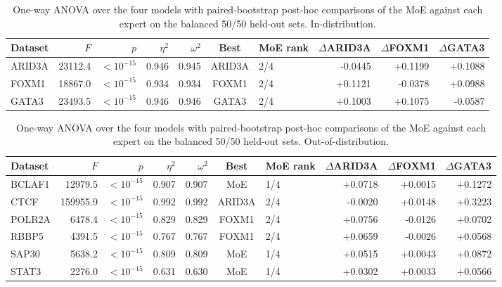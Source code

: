 \begin{table}[ht]
\centering
\caption{One-way ANOVA over the four models with paired-bootstrap post-hoc comparisons of the MoE against each expert on the balanced 50/50 held-out sets. In-distribution.}
\label{tab:rigorous_indist}
\begin{tabular}{lrrrrclrrr}
\hline
Dataset & $F$ & $p$ & $\eta^2$ & $\omega^2$ & Best & MoE rank & $\Delta$ARID3A & $\Delta$FOXM1 & $\Delta$GATA3 \\
\hline
ARID3A & 23112.4 & $<10^{-15}$ & 0.946 & 0.945 & ARID3A & 2/4 & -0.0445 & +0.1199 & +0.1088 \\
FOXM1 & 18867.0 & $<10^{-15}$ & 0.934 & 0.934 & FOXM1 & 2/4 & +0.1121 & -0.0378 & +0.0988 \\
GATA3 & 23493.5 & $<10^{-15}$ & 0.946 & 0.946 & GATA3 & 2/4 & +0.1003 & +0.1075 & -0.0587 \\
\hline
\end{tabular}
\end{table}

\begin{table}[ht]
\centering
\caption{One-way ANOVA over the four models with paired-bootstrap post-hoc comparisons of the MoE against each expert on the balanced 50/50 held-out sets. Out-of-distribution.}
\label{tab:rigorous_ood}
\begin{tabular}{lrrrrclrrr}
\hline
Dataset & $F$ & $p$ & $\eta^2$ & $\omega^2$ & Best & MoE rank & $\Delta$ARID3A & $\Delta$FOXM1 & $\Delta$GATA3 \\
\hline
BCLAF1 & 12979.5 & $<10^{-15}$ & 0.907 & 0.907 & MoE & 1/4 & +0.0718 & +0.0015 & +0.1272 \\
CTCF & 159955.9 & $<10^{-15}$ & 0.992 & 0.992 & ARID3A & 2/4 & -0.0020 & +0.0148 & +0.3223 \\
POLR2A & 6478.4 & $<10^{-15}$ & 0.829 & 0.829 & FOXM1 & 2/4 & +0.0756 & -0.0126 & +0.0702 \\
RBBP5 & 4391.5 & $<10^{-15}$ & 0.767 & 0.767 & FOXM1 & 2/4 & +0.0659 & -0.0026 & +0.0568 \\
SAP30 & 5638.2 & $<10^{-15}$ & 0.809 & 0.809 & MoE & 1/4 & +0.0515 & +0.0043 & +0.0872 \\
STAT3 & 2276.0 & $<10^{-15}$ & 0.631 & 0.630 & MoE & 1/4 & +0.0302 & +0.0033 & +0.0566 \\
\hline
\end{tabular}
\end{table}